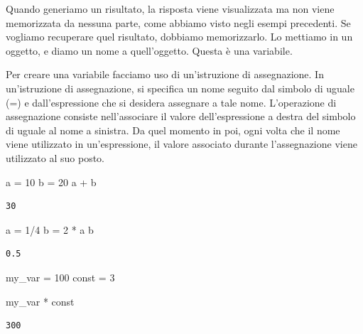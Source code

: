 \documentclass[
  letterpaper,
  krantz2]{{[}./krantz{]}}
\newenvironment{Shaded}{\begin{snugshade}}{\end{snugshade}}
\newcommand{\DecValTok}[1]{\textcolor[rgb]{0.68,0.00,0.00}{#1}}
\newcommand{\NormalTok}[1]{\textcolor[rgb]{0.00,0.23,0.31}{#1}}
\newcommand{\OperatorTok}[1]{\textcolor[rgb]{0.37,0.37,0.37}{#1}}
\begin{document}
Quando generiamo un risultato, la risposta viene visualizzata ma non
viene memorizzata da nessuna parte, come abbiamo visto negli esempi
precedenti. Se vogliamo recuperare quel risultato, dobbiamo
memorizzarlo. Lo mettiamo in un oggetto, e diamo un nome a
quell'oggetto. Questa è una variabile.

Per creare una variabile facciamo uso di un'istruzione di assegnazione.
In un'istruzione di assegnazione, si specifica un nome seguito dal
simbolo di uguale (=) e dall'espressione che si desidera assegnare a
tale nome. L'operazione di assegnazione consiste nell'associare il
valore dell'espressione a destra del simbolo di uguale al nome a
sinistra. Da quel momento in poi, ogni volta che il nome viene
utilizzato in un'espressione, il valore associato durante l'assegnazione
viene utilizzato al suo posto.

\begin{Shaded}
\begin{Highlighting}[]
\NormalTok{a }\OperatorTok{=} \DecValTok{10}
\NormalTok{b }\OperatorTok{=} \DecValTok{20}
\NormalTok{a }\OperatorTok{+}\NormalTok{ b}
\end{Highlighting}
\end{Shaded}

\begin{verbatim}
30
\end{verbatim}

\begin{Shaded}
\begin{Highlighting}[]
\NormalTok{a }\OperatorTok{=} \DecValTok{1}\OperatorTok{/}\DecValTok{4}
\NormalTok{b }\OperatorTok{=} \DecValTok{2} \OperatorTok{*}\NormalTok{ a}
\NormalTok{b}
\end{Highlighting}
\end{Shaded}

\begin{verbatim}
0.5
\end{verbatim}

\begin{Shaded}
\begin{Highlighting}[]
\NormalTok{my\_var }\OperatorTok{=} \DecValTok{100}
\NormalTok{const }\OperatorTok{=} \DecValTok{3}

\NormalTok{my\_var }\OperatorTok{*}\NormalTok{ const}
\end{Highlighting}
\end{Shaded}

\begin{verbatim}
300
\end{verbatim}
\end{document}
